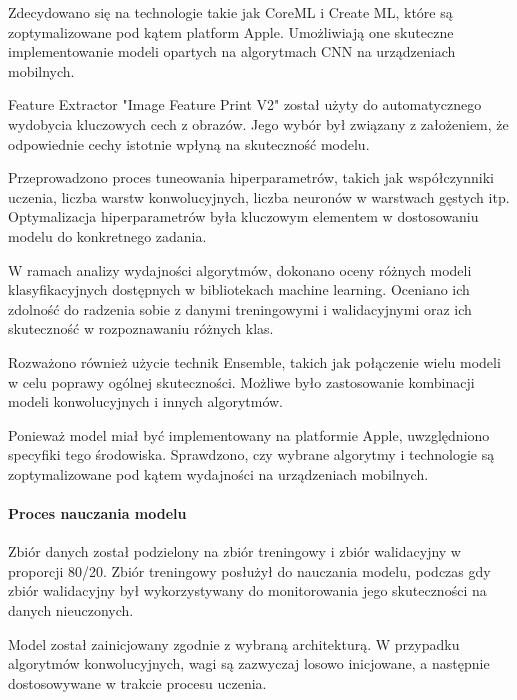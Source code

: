\documentclass[12pt, a4paper, twoside, openany]{book}
\begin{document}
Zdecydowano się na technologie takie jak CoreML i Create ML, które są zoptymalizowane pod kątem platform Apple.
Umożliwiają one skuteczne implementowanie modeli opartych na algorytmach CNN na urządzeniach mobilnych.

Feature Extractor "Image Feature Print V2" został użyty do automatycznego wydobycia kluczowych cech z obrazów.
Jego wybór był związany z założeniem, że odpowiednie cechy istotnie wpłyną na skuteczność modelu.

Przeprowadzono proces tuneowania hiperparametrów, takich jak współczynniki uczenia, liczba warstw konwolucyjnych, liczba neuronów w warstwach gęstych itp.
Optymalizacja hiperparametrów była kluczowym elementem w dostosowaniu modelu do konkretnego zadania.

W ramach analizy wydajności algorytmów, dokonano oceny różnych modeli klasyfikacyjnych dostępnych w bibliotekach machine learning.
Oceniano ich zdolność do radzenia sobie z danymi treningowymi i walidacyjnymi oraz ich skuteczność w rozpoznawaniu różnych klas.

Rozważono również użycie technik Ensemble, takich jak połączenie wielu modeli w celu poprawy ogólnej skuteczności.
Możliwe było zastosowanie kombinacji modeli konwolucyjnych i innych algorytmów.

Ponieważ model miał być implementowany na platformie Apple, uwzględniono specyfiki tego środowiska.
Sprawdzono, czy wybrane algorytmy i technologie są zoptymalizowane pod kątem wydajności na urządzeniach 
mobilnych.

\paragraph{Proces nauczania modelu\\}
Zbiór danych został podzielony na zbiór treningowy i zbiór walidacyjny w proporcji 80/20.
Zbiór treningowy posłużył do nauczania modelu, podczas gdy zbiór walidacyjny był wykorzystywany do monitorowania jego skuteczności na danych nieuczonych.

Model został zainicjowany zgodnie z wybraną architekturą. W przypadku algorytmów konwolucyjnych, wagi są zazwyczaj losowo inicjowane, a następnie dostosowywane w trakcie procesu uczenia.
\end{document}
